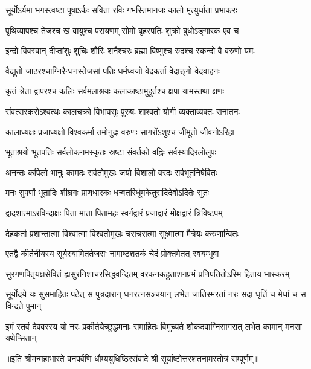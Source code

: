 


\twolineshloka
{सूर्योऽर्यमा भगस्त्वष्टा पूषाऽर्कः सविता रविः}
{गभस्तिमानजः कालो मृत्युर्धाता प्रभाकरः}

\twolineshloka
{पृथिव्यापश्च तेजश्च खं वायुश्च परायणम्}
{सोमो बृहस्पतिः शुक्रो बुधोऽङ्गारक एव च}

\twolineshloka
{इन्द्रो विवस्वान् दीप्तांशुः शुचिः शौरिः शनैश्चरः}
{ब्रह्मा विष्णुश्च रुद्रश्च स्कन्दो वै वरुणो यमः}

\twolineshloka
{वैद्युतो जाठरश्चाग्निरैन्धनस्तेजसां पतिः}
{धर्मध्वजो वेदकर्ता वेदाङ्गो वेदवाहनः}

\twolineshloka
{कृतं त्रेता द्वापरश्च कलिः सर्वमलाश्रयः}
{कलाकाष्ठामुहूर्तश्च क्षपा यामस्तथा क्षणः}

\twolineshloka
{संवत्सरकरोऽश्वत्थः कालचक्रो विभावसुः}
{पुरुषः शाश्वतो योगी व्यक्ताव्यक्तः सनातनः}

\twolineshloka
{कालाध्यक्षः प्रजाध्यक्षो विश्वकर्मा तमोनुदः}
{वरुणः सागरोंऽशुश्च जीमूतो जीवनोऽरिहा}

\twolineshloka
{भूताश्रयो भूतपतिः सर्वलोकनमस्कृतः}
{स्रष्टा संवर्तको वह्निः सर्वस्यादिरलोलुपः}

\twolineshloka
{अनन्तः कपिलो भानुः कामदः सर्वतोमुखः}
{जयो विशालो वरदः सर्वभूतनिषेवितः}

\twolineshloka
{मनः सुपर्णो भूतादिः शीघ्रगः प्राणधारकः}
{धन्वतरिर्धूमकेतुरादिदेवोऽदितेः सुतः}

\twolineshloka
{द्वादशात्माऽरविन्दाक्षः पिता माता पितामहः}
{स्वर्गद्वारं प्रजाद्वारं मोक्षद्वारं त्रिविष्टपम्}

\twolineshloka
{देहकर्ता प्रशान्तात्मा विश्वात्मा विश्वतोमुखः}
{चराचरात्मा सूक्ष्मात्मा मैत्रेयः करुणान्वितः}

\twolineshloka
{एतद्वै कीर्तनीयस्य सूर्यस्यामिततेजसः}
{नामाष्टशतकं चेदं प्रोक्तमेतत् स्वयम्भुवा}

\twolineshloka
{सुरगणपितृयक्षसेवितं ह्यसुरनिशाचरसिद्धवन्दितम्}
{वरकनकहुताशनप्रभं प्रणिपतितोऽस्मि हिताय भास्करम्}

\fourlineindentedshloka
{सूर्योदये यः सुसमाहितः पठेत्}
{स पुत्रदारान् धनरत्नसञ्चयान्}
{लभेत जातिस्मरतां नरः सदा}
{धृतिं च मेधां च स विन्दते पुमान्}

\fourlineindentedshloka
{इमं स्तवं देववरस्य यो नरः}
{प्रकीर्तयेच्छुद्धमनाः समाहितः}
{विमुच्यते शोकदवाग्निसागरात्}
{लभेत कामान् मनसा यथेप्सितान्}

॥इति श्रीमन्महाभारते वनपर्वणि धौम्ययुधिष्ठिरसंवादे श्री सूर्याष्टोत्तरशतनामस्तोत्रं सम्पूर्णम्॥
